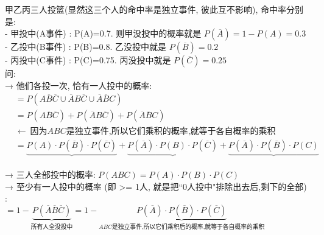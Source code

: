 \documentclass[UTF8]{ctexart}
\begin{document}
	
	\begin{myEnvSample}
		甲乙丙三人投篮(显然这三个人的命中率是独立事件, 彼此互不影响), 命中率分别是: \\
		- 甲投中(A事件) : P(A)=0.7.  则甲没投中的概率就是 $P(\overline{A}) =1- P(A) =0.3$ \\
		- 乙投中(B事件) : P(B)=0.8.  乙没投中就是 $P(\overline{B})=0.2$\\
		- 丙投中(C事件) : P(C)=0.75.  丙没投中就是 $P(\overline{C})=0.25$\\
		
		问: \\
		→ 他们各投一次, 恰有一人投中的概率: 		
		\begin{align*}  %
			&=P\left( A\overline{B}\overline{C}\cup \overline{A}B\overline{C}\cup \overline{A}\overline{B}C \right)\\
			&=P\left( A\overline{B}\overline{C} \right) +P\left( \overline{A}B\overline{C} \right) +P\left( \overline{A}\overline{B}C \right) \\
			&  ←\ \text{因为}ABC\text{是独立事件,所以它们乘积的概率,就等于各自概率的乘积}\\
			&=\underset{}{\underbrace{P\left( A \right) \cdot P\left( \overline{B} \right) \cdot P\left( \overline{C} \right) }}+\underset{}{\underbrace{P\left( \overline{A} \right) \cdot P\left( B \right) \cdot P\left( \overline{C} \right) }}+\underset{}{\underbrace{P\left( \overline{A} \right) \cdot P\left( \overline{B} \right) \cdot P\left( C \right) }}
		\end{align*}
		
		→ 三人全部投中的概率: $P(ABC)=P(A)\cdot P(B)\cdot P(C)$ \\
		
		→ 至少有一人投中的概率 (即 >= 1人, 就是把``0人投中"排除出去后,剩下的全部) : \\
		$=1-\underset{\text{所有人全没投中}}{\underbrace{P(\overline{A}\overline{B}\overline{C})}}=1-\underset{ABC\text{是独立事件,所以它们乘积后的概率,就等于各自概率的乘积}}{\underbrace{P\left( \overline{A} \right) \cdot P\left( \overline{B} \right) \cdot P\left( \overline{C} \right) }}	$	
	\end{myEnvSample}
	
	\vspace{1em} 
	
\end{document}

